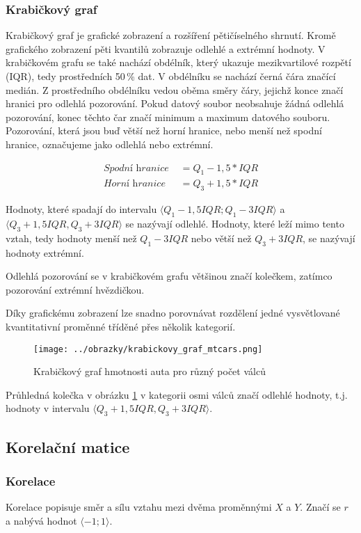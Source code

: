 \subsubsection{Krabičkový graf}
Krabičkový graf je grafické zobrazení a rozšíření pětičíselného shrnutí. Kromě grafického zobrazení pěti kvantilů  zobrazuje odlehlé a extrémní hodnoty.
V krabičkovém grafu se také nachází obdélník, který ukazuje mezikvartilové rozpětí (IQR), tedy prostředních 50\,\% dat. V obdélníku se nachází černá čára značící medián.
Z prostředního obdélníku vedou oběma směry čáry, jejichž konce značí hranici pro odlehlá pozorování. Pokud datový soubor neobsahuje žádná odlehlá pozorování, konec těchto čar
značí minimum a maximum datového souboru.
Pozorování, která jsou buď větší než horní hranice, nebo menší než spodní hranice, označujeme jako odlehlá nebo extrémní. 

\begin{align*}
    \textit{Spodní hranice } &= Q_1 - 1,5 * IQR \\
    \textit{Horní hranice } &= Q_3 + 1,5 * IQR
\end{align*}

Hodnoty, které spadají do intervalu $\langle Q_1 - 1,5IQR; Q_1 - 3IQR\rangle$ a $\langle Q_3 + 1,5IQR, Q_3 + 3IQR \rangle$ se nazývají odlehlé.
Hodnoty, které leží mimo tento vztah, tedy hodnoty menší než $Q_1 - 3IQR$ nebo větší než $Q_3 + 3IQR$, se nazývají hodnoty extrémní.

Odlehlá pozorování se v krabičkovém grafu většinou značí kolečkem, zatímco pozorování extrémní hvězdičkou.

Díky grafickému zobrazení lze snadno porovnávat rozdělení jedné vysvětlované kvantitativní proměnné tříděné přes několik kategorií.

\begin{figure}[H]
    \centering
    \texttt{[image: ../obrazky/krabickovy\_graf\_mtcars.png]}
    \caption{Krabičkový graf hmotnosti auta pro různý počet válců} 
    \label{fig:krabickovy_graf_mtcars}
\end{figure}

Průhledná kolečka v obrázku \ref{fig:krabickovy_graf_mtcars} v kategorii osmi válců značí odlehlé hodnoty, t.j. hodnoty
v intervalu $\langle Q_3 + 1,5IQR, Q_3 + 3IQR \rangle$.


\subsection{Korelační matice}
\subsubsection{Korelace}
Korelace popisuje směr a sílu vztahu mezi dvěma proměnnými $X$ a $Y$. Značí se $r$ a nabývá hodnot $\langle -1; 1 \rangle$.

